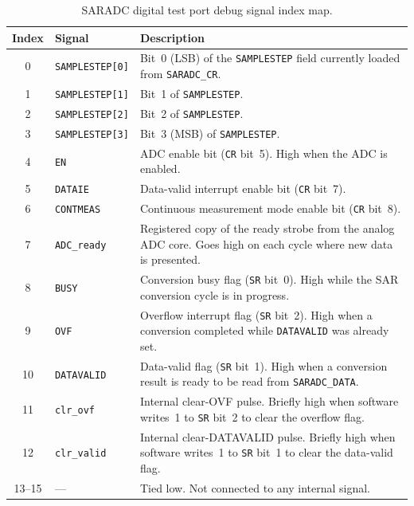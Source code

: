 \begin{table}[h]
\centering
\begin{tabularx}{\textwidth}{c l X}
\hline
\textbf{Index} & \textbf{Signal} & \textbf{Description} \\
\hline
0  & \texttt{SAMPLESTEP[0]} & Bit~0 (LSB) of the \texttt{SAMPLESTEP} field currently loaded from \texttt{SARADC\_CR}. \\
1  & \texttt{SAMPLESTEP[1]} & Bit~1 of \texttt{SAMPLESTEP}. \\
2  & \texttt{SAMPLESTEP[2]} & Bit~2 of \texttt{SAMPLESTEP}. \\
3  & \texttt{SAMPLESTEP[3]} & Bit~3 (MSB) of \texttt{SAMPLESTEP}. \\
4  & \texttt{EN}            & ADC enable bit (\texttt{CR} bit~5). High when the ADC is enabled. \\
5  & \texttt{DATAIE}        & Data-valid interrupt enable bit (\texttt{CR} bit~7). \\
6  & \texttt{CONTMEAS}      & Continuous measurement mode enable bit (\texttt{CR} bit~8). \\
7  & \texttt{ADC\_ready}    & Registered copy of the ready strobe from the analog ADC core. Goes high on each cycle where new data is presented. \\
8  & \texttt{BUSY}          & Conversion busy flag (\texttt{SR} bit~0). High while the SAR conversion cycle is in progress. \\
9  & \texttt{OVF}           & Overflow interrupt flag (\texttt{SR} bit~2). High when a conversion completed while \texttt{DATAVALID} was already set. \\
10 & \texttt{DATAVALID}     & Data-valid flag (\texttt{SR} bit~1). High when a conversion result is ready to be read from \texttt{SARADC\_DATA}. \\
11 & \texttt{clr\_ovf}      & Internal clear-OVF pulse. Briefly high when software writes~1 to \texttt{SR} bit~2 to clear the overflow flag. \\
12 & \texttt{clr\_valid}    & Internal clear-DATAVALID pulse. Briefly high when software writes~1 to \texttt{SR} bit~1 to clear the data-valid flag. \\
13--15 & ---                & Tied low. Not connected to any internal signal. \\
\hline
\end{tabularx}
\caption{SARADC digital test port debug signal index map.}
\label{t:saradc-dtp}
\end{table}
